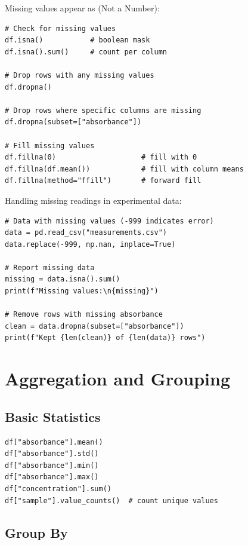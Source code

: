 Missing values appear as  (Not a Number):

\begin{lstlisting}
# Check for missing values
df.isna()           # boolean mask
df.isna().sum()     # count per column

# Drop rows with any missing values
df.dropna()

# Drop rows where specific columns are missing
df.dropna(subset=["absorbance"])

# Fill missing values
df.fillna(0)                    # fill with 0
df.fillna(df.mean())            # fill with column means
df.fillna(method="ffill")       # forward fill
\end{lstlisting}

\begin{labexample}
Handling missing readings in experimental data:

\begin{lstlisting}
# Data with missing values (-999 indicates error)
data = pd.read_csv("measurements.csv")
data.replace(-999, np.nan, inplace=True)

# Report missing data
missing = data.isna().sum()
print(f"Missing values:\n{missing}")

# Remove rows with missing absorbance
clean = data.dropna(subset=["absorbance"])
print(f"Kept {len(clean)} of {len(data)} rows")
\end{lstlisting}
\end{labexample}

\section{Aggregation and Grouping}
\label{sec:aggregation}

\subsection{Basic Statistics}

\begin{lstlisting}
df["absorbance"].mean()
df["absorbance"].std()
df["absorbance"].min()
df["absorbance"].max()
df["concentration"].sum()
df["sample"].value_counts()  # count unique values
\end{lstlisting}

\subsection{Group By}

